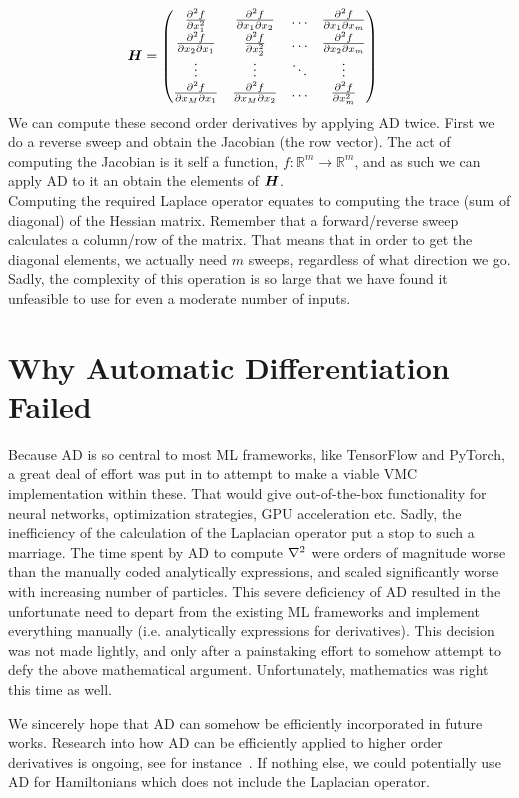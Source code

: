 \documentclass[Thesis.tex]{subfiles}
\begin{document}
\begin{align}
  \bm{H} &=
  \begin{pmatrix}
    \pdv[2]{f}{x_1} & \pdv{f}{x_1}{x_2} & \dots & \pdv{f}{x_1}{x_m}\\
    \pdv{f}{x_2}{x_1} & \pdv[2]{f}{x_2} & \dots & \pdv{f}{x_2}{x_m}\\
    \vdots & \vdots & \ddots & \vdots\\                          
    \pdv{f}{x_M}{x_1} & \pdv{f}{x_M}{x_2} & \dots & \pdv[2]{f}{x_m}\\
  \end{pmatrix}
\end{align}
We can compute these second order derivatives by applying AD twice. First we do
a reverse sweep and obtain the Jacobian (the row vector). The act of computing
the Jacobian is it self a function, $f: \mathbb{R}^m\to\mathbb{R}^m$, and as
such we can apply AD to it an obtain the elements of $\bm{H}$.\\

Computing the required Laplace operator equates to computing the trace (sum of
diagonal) of the Hessian matrix. Remember that a forward/reverse sweep
calculates a column/row of the matrix. That means that in order to get the
diagonal elements, we actually need $m$ sweeps, regardless of what direction we
go. Sadly, the complexity of this operation is so large that we have found it
unfeasible to use for even a moderate number of inputs. 


\section{Why Automatic Differentiation Failed}

Because AD is so central to most ML frameworks, like TensorFlow and PyTorch, a
great deal of effort was put in to attempt to make a viable VMC implementation
within these. That would give out-of-the-box functionality for neural networks,
optimization strategies, GPU acceleration etc. Sadly, the inefficiency of the
calculation of the Laplacian operator put a stop to such a marriage. The time
spent by AD to compute $\laplacian$ were orders of magnitude worse than the
manually coded analytically expressions, and scaled significantly worse with
increasing number of particles. This severe deficiency of AD resulted
in the unfortunate need to depart from the existing ML frameworks and
implement everything manually (i.e. analytically expressions for derivatives).
This decision was not made lightly, and only after a painstaking effort to
somehow attempt to defy the above mathematical argument. Unfortunately,
mathematics was right this time as well.

We sincerely hope that AD can somehow be efficiently incorporated in future
works. Research into how AD can be efficiently applied to higher order
derivatives is ongoing, see for instance~\textcite{wang2017}. If nothing else,
we could potentially use AD for Hamiltonians which does not include the Laplacian
operator.
\end{document}
